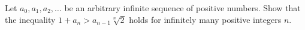 Let $a_0, a_1, a_2, \ldots$ be an arbitrary infinite sequence of positive numbers. Show that the inequality $1 + a_n > a_{n-1} \sqrt[n]{2}$ holds for infinitely many positive integers $n$.
